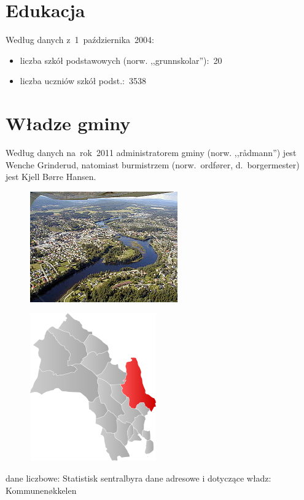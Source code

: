 \documentclass[a4paper,12pt]{article}
\begin{document}
\section{Edukacja}
Według danych z~1~października~2004:
\begin{itemize}
\item liczba szkół podstawowych (norw. ,,grunnskolar''):~20
\item liczba uczniów szkół podst.:~3538
\end{itemize}

\section{Władze gminy}
Według danych na~rok~2011 administratorem gminy (norw. ,,rådmann'') jest Wenche Grinderud, natomiast burmistrzem (norw.~ordfører, d.~borgermester) jest Kjell Børre Hansen.
\begin{figure}[p]
\caption{}
\label{zdj1}
\centering
\includegraphics{Ringerike.jpg}
\end{figure}

\begin{figure}[p]
\caption{}
\label{zdj2}
\centering
\includegraphics{Mapka.png}
\end{figure}

\begin{thebibliography}{99}
\emph {}dane liczbowe: Statistisk sentralbyra
\emph {}dane adresowe i dotyczące władz: Kommunenøkkelen
\end{thebibliography}
\end{document}
